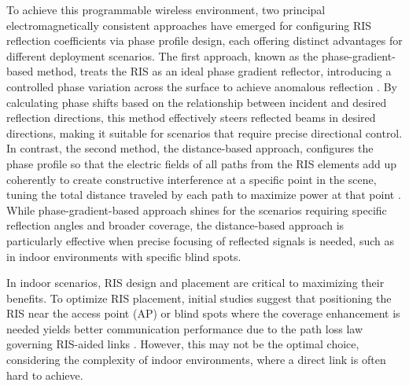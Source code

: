 \documentclass{IEEEoj}
\begin{document}
To achieve this programmable wireless environment, two principal electromagnetically consistent approaches have emerged for configuring RIS reflection coefficients via phase profile design, each offering distinct advantages for different deployment scenarios. The first approach, known as the phase-gradient-based method, treats the RIS as an ideal phase gradient reflector, introducing a controlled phase variation across the surface to achieve anomalous reflection \cite{phase_grad_paper}. By calculating phase shifts based on the relationship between incident and desired reflection directions, this method effectively steers reflected beams in desired directions, making it suitable for scenarios that require precise directional control. In contrast, the second method, the distance-based approach, configures the phase profile so that the electric fields of all paths from the RIS elements add up coherently to create constructive interference at a specific point in the scene, tuning the total distance traveled by each path to maximize power at that point \cite{Tang}. While phase-gradient-based approach shines for the scenarios requiring specific reflection angles and broader coverage, the distance-based approach is particularly effective when precise focusing of reflected signals is needed, such as in indoor environments with specific blind spots.

In indoor scenarios, RIS design and placement are critical to maximizing their benefits. To optimize RIS placement, initial studies suggest that positioning the RIS near the access point (AP) or blind spots where the coverage enhancement is needed yields better communication performance due to the path loss law governing RIS-aided links \cite{RISDeploymentComparison,act_passive}. However, this may not be the optimal choice, considering the complexity of indoor environments, where a direct link is often hard to achieve.
\end{document}

